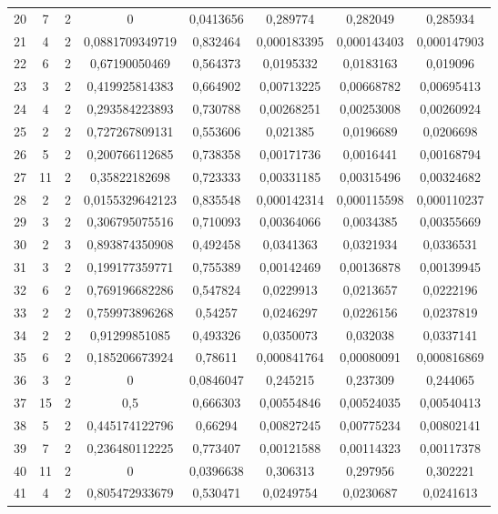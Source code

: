 \begin{longtable}{|c|c|c|c|c|c|c|c|}
20 & 7 & 2 & 0 & 0,0413656 & 0,289774 & 0,282049 & 0,285934  \\
21 & 4 & 2 & 0,0881709349719 & 0,832464 & 0,000183395 & 0,000143403 & 0,000147903  \\
22 & 6 & 2 & 0,67190050469 & 0,564373 & 0,0195332 & 0,0183163 & 0,019096  \\
23 & 3 & 2 & 0,419925814383 & 0,664902 & 0,00713225 & 0,00668782 & 0,00695413  \\
24 & 4 & 2 & 0,293584223893 & 0,730788 & 0,00268251 & 0,00253008 & 0,00260924  \\
25 & 2 & 2 & 0,727267809131 & 0,553606 & 0,021385 & 0,0196689 & 0,0206698  \\
26 & 5 & 2 & 0,200766112685 & 0,738358 & 0,00171736 & 0,0016441 & 0,00168794  \\
27 & 11 & 2 & 0,35822182698 & 0,723333 & 0,00331185 & 0,00315496 & 0,00324682  \\
28 & 2 & 2 & 0,0155329642123 & 0,835548 & 0,000142314 & 0,000115598 & 0,000110237  \\
29 & 3 & 2 & 0,306795075516 & 0,710093 & 0,00364066 & 0,0034385 & 0,00355669  \\
30 & 2 & 3 & 0,893874350908 & 0,492458 & 0,0341363 & 0,0321934 & 0,0336531  \\
31 & 3 & 2 & 0,199177359771 & 0,755389 & 0,00142469 & 0,00136878 & 0,00139945  \\
32 & 6 & 2 & 0,769196682286 & 0,547824 & 0,0229913 & 0,0213657 & 0,0222196  \\
33 & 2 & 2 & 0,759973896268 & 0,54257 & 0,0246297 & 0,0226156 & 0,0237819  \\
34 & 2 & 2 & 0,91299851085 & 0,493326 & 0,0350073 & 0,032038 & 0,0337141  \\
35 & 6 & 2 & 0,185206673924 & 0,78611 & 0,000841764 & 0,00080091 & 0,000816869  \\
36 & 3 & 2 & 0 & 0,0846047 & 0,245215 & 0,237309 & 0,244065  \\
37 & 15 & 2 & 0,5 & 0,666303 & 0,00554846 & 0,00524035 & 0,00540413  \\
38 & 5 & 2 & 0,445174122796 & 0,66294 & 0,00827245 & 0,00775234 & 0,00802141  \\
39 & 7 & 2 & 0,236480112225 & 0,773407 & 0,00121588 & 0,00114323 & 0,00117378  \\
40 & 11 & 2 & 0 & 0,0396638 & 0,306313 & 0,297956 & 0,302221  \\
41 & 4 & 2 & 0,805472933679 & 0,530471 & 0,0249754 & 0,0230687 & 0,0241613  \\

\end{longtable}
